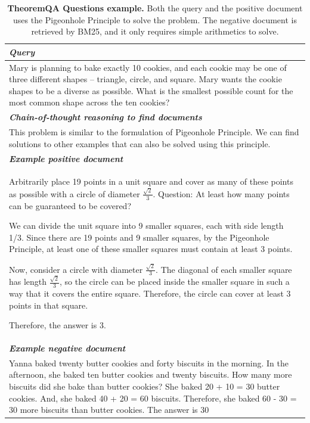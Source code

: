 \begin{table}[ht]
\caption{\textbf{TheoremQA Questions example.} Both the query and the positive document uses the Pigeonhole Principle to solve the problem. The negative document is retrieved by BM25, and it only requires simple arithmetics to solve.}
\centering
\begin{tabular}{p{13cm}}
\toprule
\textit{\textbf{Query}} \\
\midrule
Mary is planning to bake exactly 10 cookies, and each cookie may be one of three different shapes -- triangle, circle, and square. Mary wants the cookie shapes to be a diverse as possible. What is the smallest possible count for the most common shape across the ten cookies?\\
\midrule
\textit{\textbf{Chain-of-thought reasoning to find documents}} \\
\midrule
This problem is similar to the formulation of Pigeonhole Principle. We can find solutions to other examples that can also be solved using this principle.\\
\midrule
\textit{\textbf{Example positive document}} \\
\midrule
Arbitrarily place 19 points in a unit square and cover as many of these points as possible with a circle of diameter $\frac{\sqrt 2}{3}$. Question: At least how many points can be guaranteed to be covered?

We can divide the unit square into 9 smaller squares, each with side length 1/3. Since there are 19 points and 9 smaller squares, by the Pigeonhole Principle, at least one of these smaller squares must contain at least 3 points.

Now, consider a circle with diameter $\frac{\sqrt 2}{3}$. The diagonal of each smaller square has length $\frac{\sqrt 2}{3}$, so the circle can be placed inside the smaller square in such a way that it covers the entire square. Therefore, the circle can cover at least 3 points in that square.

Therefore, the answer is 3.\\
\midrule
\textit{\textbf{Example negative document}} \\
\midrule
Yanna baked twenty butter cookies and forty biscuits in the morning.  In the afternoon, she baked ten butter cookies and twenty biscuits. How many more biscuits did she bake than butter cookies?
She baked 20 + 10 = 30 butter cookies.
And, she baked 40 + 20 = 60 biscuits.
Therefore, she baked 60 - 30 = 30 more biscuits than butter cookies.
The answer is 30
\\
\bottomrule
\end{tabular}
\label{tab:example_theoremqa}
\end{table}